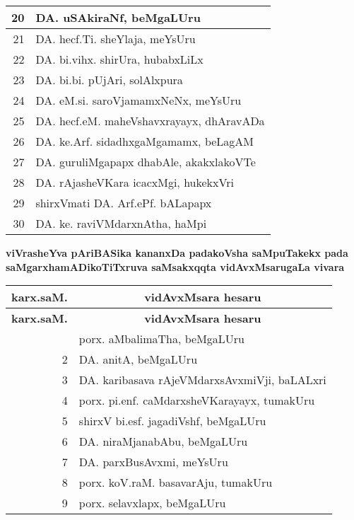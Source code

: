{\begin{longtable}{|r|p{10cm}|}
\hline
20 & DA. uSAkiraNf, beMgaLUru\\
\hline
21 & DA. hecf.Ti. sheYlaja, meYsUru\\
\hline
22 & DA. bi.vihx. shirUra, hubabxLiLx\\
\hline
23 & DA. bi.bi. pUjAri, solAlxpura\\
\hline
24 & DA. eM.si. saroVjamamxNeNx, meYsUru\\
\hline
25 & DA. hecf.eM. maheVshavxrayayx, dhAravADa\\
\hline
26 & DA. ke.Arf. sidadhxgaMgamamx, beLagAM\\
\hline
27 & DA. guruliMgapapx dhabAle, akakxlakoVTe\\
\hline
28 & DA. rAjasheVKara icacxMgi, hukekxVri\\
\hline
29 & shirxVmati DA. Arf.ePf. bALapapx\\
\hline
30 & DA. ke. raviVMdarxnAtha, haMpi\\
\hline
\end{longtable}}

\vskip 1cm


\begin{center}
{\large\bf viVrasheYva pAriBASika kananxDa padakoVsha saMpuTakekx pada saMgarxha\break mADikoTiTxruva saMsakxqqta vidAvxMsarugaLa vivara}
\end{center}

{\renewcommand{\arraystretch}{1.4}
\begin{longtable}{|r|p{10cm}|}
\hline
{\bf karx.saM.} & \multicolumn{1}{c|}{\bf vidAvxMsara hesaru}\\
\hline
\endfirsthead
\hline
{\bf karx.saM.} & \multicolumn{1}{c|}{\bf vidAvxMsara hesaru}\\
\hline
\endhead
\hline
\endfoot
\endlastfoot
1 & porx. aMbalimaTha, beMgaLUru\\
\hline
2 & DA. anitA, beMgaLUru\\
\hline
3 & DA. karibasava rAjeVMdarxsAvxmiVji, baLALxri\\
\hline
4 & porx. pi.enf. caMdarxsheVKarayayx, tumakUru\\
\hline
5 & shirxV bi.esf. jagadiVshf, beMgaLUru\\
\hline
6 & DA. niraMjanabAbu, beMgaLUru\\
\hline
7 & DA. parxBusAvxmi, meYsUru\\
\hline
8 & porx. koV.raM. basavarAju, tumakUru\\
\hline
9 & porx. selavxlapx, beMgaLUru\\
\hline
\end{longtable}}

